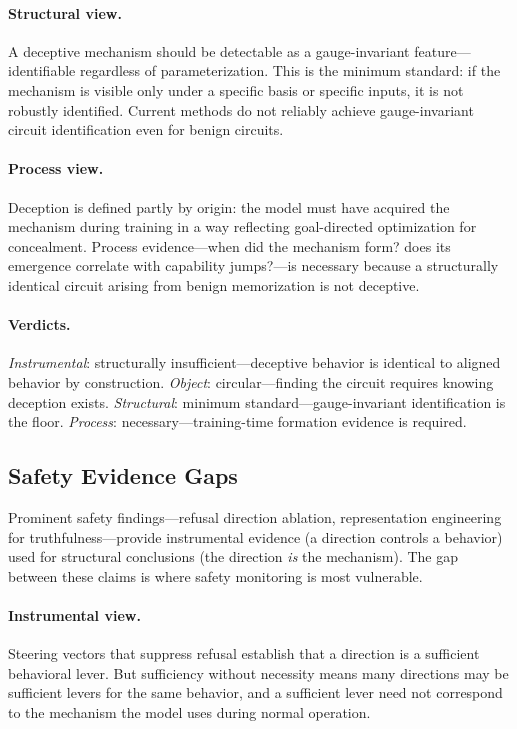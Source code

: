 \documentclass{article}
\begin{document}
\paragraph{Structural view.}
A deceptive mechanism should be detectable as a gauge-invariant
feature---identifiable regardless of parameterization. This is the
minimum standard: if the mechanism is visible only under a specific basis
or specific inputs, it is not robustly identified. Current methods do
not reliably achieve gauge-invariant circuit identification even for
benign circuits.

\paragraph{Process view.}
Deception is defined partly by origin: the model must have acquired the
mechanism during training in a way reflecting goal-directed optimization
for concealment. Process evidence---when did the mechanism form? does its
emergence correlate with capability jumps?---is necessary because a
structurally identical circuit arising from benign memorization is not
deceptive.

\paragraph{Verdicts.}
\emph{Instrumental}: structurally insufficient---deceptive behavior is
identical to aligned behavior by construction.
\emph{Object}: circular---finding the circuit requires knowing deception
exists.
\emph{Structural}: minimum standard---gauge-invariant identification is
the floor.
\emph{Process}: necessary---training-time formation evidence is required.


\subsection{Safety Evidence Gaps}\label{app:cs_safety}

Prominent safety findings---refusal direction ablation, representation
engineering for truthfulness---provide instrumental evidence (a direction
controls a behavior) used for structural conclusions (the direction
\emph{is} the mechanism). The gap between these claims is where safety
monitoring is most vulnerable.

\paragraph{Instrumental view.}
Steering vectors that suppress refusal establish that a direction is a
sufficient behavioral lever. But sufficiency without necessity means many
directions may be sufficient levers for the same behavior, and a
sufficient lever need not correspond to the mechanism the model uses
during normal operation.
\end{document}
